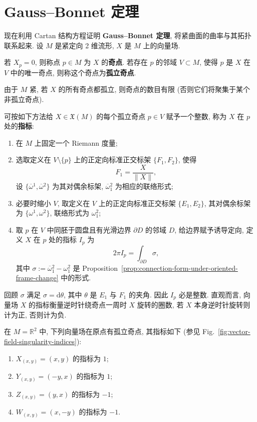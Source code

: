 \section{Gauss–Bonnet 定理}\label{sec:gauss-bonnet-theorem}

现在利用 Cartan 结构方程证明 \textbf{Gauss–Bonnet 定理}, 将紧曲面的曲率与其拓扑联系起来. 设 $M$ 是紧定向 2 维流形, $X$ 是 $M$ 上的向量场.

\begin{RiemannDefinition}\label{def:isolated-singularity-of-vector-field}
若 $X_p=0$, 则称点 $p\in M$ 为 $X$ 的\textbf{奇点}. 若存在 $p$ 的邻域 $V\subset M$, 使得 $p$ 是 $X$ 在 $V$ 中的唯一奇点, 则称这个奇点为\textbf{孤立奇点}.
\end{RiemannDefinition}

由于 $M$ 紧, 若 $X$ 的所有奇点都孤立, 则奇点的数目有限 (否则它们将聚集于某个非孤立奇点).

可按如下方法给 $X\in\mathfrak{X}(M)$ 的每个孤立奇点 $p\in V$ 赋予一个整数, 称为 $X$ 在 $p$ 处的\textbf{指标}:
\begin{enumerate}[label=(\roman*),leftmargin=*]
\item 在 $M$ 上固定一个 Riemann 度量;
\item 选取定义在 $V\setminus\{p\}$ 上的正定向标准正交标架 $\{F_1,F_2\}$, 使得
\[
  F_1=\frac{X}{\lVert X\rVert},
\]
设 $\{\overline\omega{}^1,\overline\omega{}^2\}$ 为其对偶余标架, $\overline\omega{}_1^2$ 为相应的联络形式;
\item 必要时缩小 $V$, 取定义在 $V$ 上的正定向标准正交标架 $\{E_1,E_2\}$, 其对偶余标架为 $\{\omega^1,\omega^2\}$, 联络形式为 $\omega_1^2$;
\item 取 $p$ 在 $V$ 中同胚于圆盘且有光滑边界 $\partial D$ 的邻域 $D$, 给边界赋予诱导定向, 定义 $X$ 在 $p$ 处的指标 $I_p$ 为
\[
  2\pi I_p=\int_{\partial D}\sigma,
\]
其中 $\sigma:=\overline\omega{}_1^2-\omega_1^2$ 是 Proposition~\ref{prop:connection-form-under-oriented-frame-change} 中的形式.
\end{enumerate}
回顾 $\sigma$ 满足 $\sigma=\mathrm{d}\theta$, 其中 $\theta$ 是 $E_1$ 与 $F_1$ 的夹角. 因此 $I_p$ 必是整数. 直观而言, 向量场 $X$ 的指标衡量逆时针绕奇点一周时 $X$ 旋转的圈数, 若 $X$ 本身逆时针旋转则计为正, 否则计为负.

\begin{RiemannExample}\label{ex:four-vector-field-indices}
在 $M=\mathbb{R}^2$ 中, 下列向量场在原点有孤立奇点, 其指标如下 (参见 Fig.~\ref{fig:vector-field-singularity-indices}):
\begin{enumerate}[label=(\arabic*),leftmargin=*]
\item $X_{(x,y)}=(x,y)$ 的指标为 $1$;
\item $Y_{(x,y)}=(-y,x)$ 的指标为 $1$;
\item $Z_{(x,y)}=(y,x)$ 的指标为 $-1$;
\item $W_{(x,y)}=(x,-y)$ 的指标为 $-1$.
\end{enumerate}
\end{RiemannExample}

